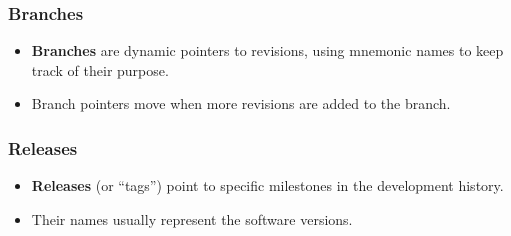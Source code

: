 \documentclass[aspectratio=169,xcolor=table]{beamer}
\begin{document}
    \begin{frame}
        \frametitle{Branches}
        \begin{block}{}
            \begin{itemize}
                \item \textbf{Branches} are dynamic pointers to revisions,
                    using mnemonic names to keep track of their purpose.
                \item Branch pointers move when more revisions are added to the
                    branch.
            \end{itemize}
        \end{block}
        \vfill
        \begin{figure}
            \centering
            \scalebox{0.8}{}
        \end{figure}
    \end{frame}

    \begin{frame}
        \frametitle{Releases}
        \begin{block}{}
            \begin{itemize}
                \item \textbf{Releases} (or ``tags'') point to specific
                    milestones in the development history.
                \item Their names usually represent the software versions.
            \end{itemize}
        \end{block}
        \vfill
        \begin{figure}
            \centering
            \scalebox{0.8}{}
        \end{figure}
    \end{frame}
\end{document}
